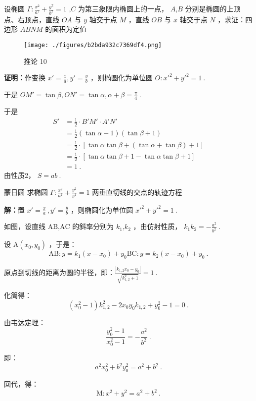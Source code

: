 \begin{corollary}{}
设椭圆 $\displaystyle{\Gamma:\frac{x^2}{a^2}+\frac{y^2}{b^2}=1}$ ,$\displaystyle{C}$ 为第三象限内椭圆上的一点， $\displaystyle{A}$,$\displaystyle{B}$ 分别是椭圆的上顶点、右顶点，直线 $\displaystyle{OA}$ 与 $\displaystyle{y}$ 轴交于点 $\displaystyle{M}$ ，直线 $\displaystyle{OB}$ 与 $\displaystyle{x}$ 轴交于点 $\displaystyle{N}$ ，求证：四边形 $\displaystyle{ABNM}$ 的面积为定值\begin{figure}[ht]
\centering
\texttt{[image: ./figures/b2bda932c7369df4.png]}
\caption{推论 10} \label{fig_affine_8}
\end{figure}

\textbf{证明：}作变换 $\displaystyle{x'=\frac{x}{a},y'=\frac{y}{b}}$ ，则椭圆化为单位圆 $\displaystyle{O:x'^2+y'^2=1}~.$

于是 $\displaystyle{OM'=\tan{\beta},ON'=\tan{\alpha},\alpha+\beta=\frac{\pi}{4}}~.$

于是
$$
\begin{aligned}
 S'&=\frac{1}{2}\cdot B'M'\cdot A'N'\\
 &=\frac{1}{2}(\tan\alpha+1)(\tan\beta+1)\\
 &=\frac{1}{2}\cdot\left[\tan\alpha\tan\beta+(\tan\alpha+\tan\beta)+1\right]\\
 &=\frac{1}{2}\cdot[\tan\alpha\tan\beta+1-\tan\alpha\tan\beta+1]\\
 &=1 ~.
\end{aligned}
$$
由性质2， $\displaystyle{S=ab}~.$ 
\end{corollary}
\begin{corollary}{蒙日圆}
求椭圆 $\displaystyle{\Gamma:\frac{x^2}{a^2}+\frac{y^2}{b^2}=1}$ 两垂直切线的交点的轨迹方程

\textbf{解：}置 $\displaystyle{x'=\frac{x}{a}\,,y'=\frac{y}b}$ ，则椭圆化为单位圆 $\displaystyle{x'^2+y'^2=1}~.$ 

如图，设直线 $\displaystyle{\text{AB}}$,$\displaystyle{\text{AC}}$ 的斜率分别为 $\displaystyle{k_1}$,$\displaystyle{k_2}$ ，由仿射性质， $\displaystyle{k_1k_2=-\frac{a^2}{b^2}}~.$ 

设 $\displaystyle{\text{A}(x_0,y_0)}$ ，于是： 
$$\text{AB}:y=k_1(x-x_0)+y_0\text{BC}:y=k_2(x-x_0)+y_0 ~.$$

原点到切线的距离为圆的半径，即：$\displaystyle{\frac{|k_{1,2}x_0-y_0|}{\sqrt{k_{1,2}^2+1}}=1}~.$

化简得：
$$(x_0^2-1)k_{1,2}^2-2x_0y_0k_{1,2}+y_0^2-1=0~.$$

由韦达定理：
$$\frac{y_0^2-1}{x_0^2-1}=-\frac{a^2}{b^2}~.$$

即：
$$a^2x_0^2+b^2y_0^2=a^2+b^2~.$$

回代，得：
$$\text{M}:x^2+y^2=a^2+b^2~.$$
\end{corollary}
